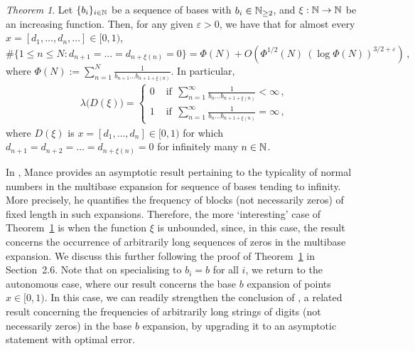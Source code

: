 \documentclass[11pt,reqno]{amsart}
\newcommand{\N}{{\Bbb N}}
\newcommand{\0}{\mathbf{0}}
\newtheorem{TAA}{Theorem}
\theoremstyle{remark}
\numberwithin{equation}{section}
\newtheorem{TAA}{Theorem}
\theoremstyle{remark}
\numberwithin{equation}{section}
\begin{document}
\begin{TAA}\label{ABcf}
Let $\{b_i\}_{i \in \N}$ be a sequence of bases with $b_i \in \N_{\geq 2}$, and $\xi: \N \to \N$ be an increasing function. Then, for any given $\varepsilon>0$, we have that for almost every $x=[d_1,\dots,d_n,\dots] \in [0,1)$,
$$ \# \big\{ 1\le n \le   N :   d_{n+1}=\dots=d_{n+\xi(n)}=0 \big\} =\Phi(N)+O\left(\Phi^{1/2}(N) \ (\log\Phi(N))^{3/2+\varepsilon}\right) \, ,
$$  where $\Phi(N):=\sum\limits_{n=1}^N \frac{1}{b_{n+1}\dots b_{n+1+\xi(n)}}$. 
In particular, 
\begin{eqnarray*}
   \lambda \big(D(\xi)\big) = \begin{cases}
        0 &\text{ \ if}\ \  \sum\limits_{n=1}^\infty \frac{1}{b_n\dots b_{n+1+\xi(n)}} <\infty \, ,\\[2ex]
        1 &\text{ \ if}\ \ \sum\limits_{n=1}^\infty \frac{1}{b_n\dots b_{n+1+\xi(n)}}
        =\infty \, ,
    \end{cases}
	\end{eqnarray*}
    where $D(\xi)$ is $x=[d_1,\dots,d_n]\in [0,1)$ for which $d_{n+1}=d_{n+2}=\dots=d_{n+\xi(n)}=0$ 
        for infinitely many $n \in \N $.
\end{TAA}
In \cite{mance}, Mance provides an asymptotic result pertaining to the typicality of normal numbers in the multibase expansion for sequence of bases tending to infinity. More precisely, he quantifies the frequency of blocks (not necessarily zeros) of fixed length in such expansions. Therefore, the more `interesting’ case of Theorem~\ref{ABcf} is when the function $\xi$ is unbounded, since, in this case, the  result concerns the occurrence of arbitrarily long sequences of zeros in the multibase expansion. We discuss this further following the proof of Theorem~\ref{ABcf} in Section~2.6. Note that on specialising to $b_i=b$ for all $i$, we return to  the autonomous case, where our result concerns the base
$b$ expansion of points  $x\in[0,1)$. In this case, we can readily strengthen the conclusion of \cite[Theorem~5]{FMP},  a related result concerning the frequencies of arbitrarily long strings of digits (not necessarily zeros) in the base $b$ expansion, by upgrading it to an asymptotic statement with optimal error.
 \medskip
 
\end{document}
